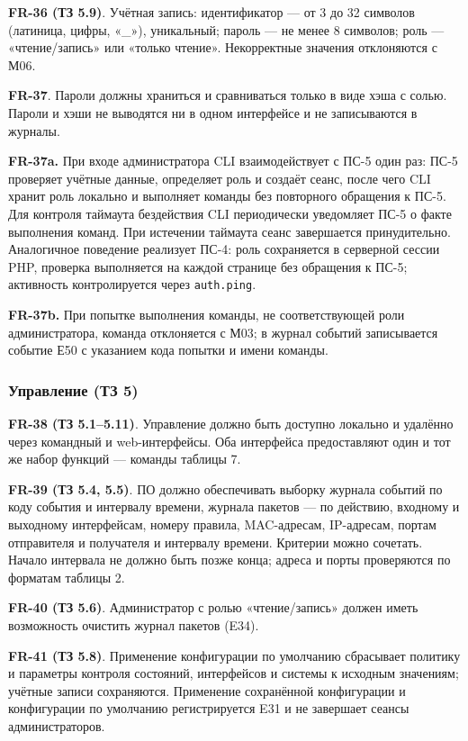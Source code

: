 \documentclass[13pt,a4paper,final]{article}
\begin{document}
	\textbf{FR-36 (ТЗ 5.9)}. Учётная запись: идентификатор — от 3 до 32 символов (латиница, цифры, «\_»), уникальный; пароль — не менее 8 символов; роль — «чтение/запись» или «только чтение». Некорректные значения отклоняются с М06.
	
	\textbf{FR-37}. Пароли должны храниться и сравниваться только в виде хэша с солью. Пароли и хэши не выводятся ни в одном интерфейсе и не записываются в журналы.
	
	\textbf{FR-37a.} При входе администратора CLI взаимодействует с ПС-5 один раз: ПС-5 проверяет учётные данные, определяет роль и создаёт сеанс, после чего CLI хранит роль локально и выполняет команды без повторного обращения к ПС-5. Для контроля таймаута бездействия CLI периодически уведомляет ПС-5 о факте выполнения команд. При истечении таймаута сеанс завершается принудительно. {Аналогичное поведение реализует ПС-4: роль сохраняется в серверной сессии PHP, проверка выполняется на каждой странице без обращения к ПС-5; активность контролируется через \texttt{auth.ping}.}
	
	\textbf{FR-37b.} При попытке выполнения команды, не соответствующей роли администратора, команда отклоняется с М03; в журнал событий записывается событие Е50 с указанием кода попытки и имени команды.
	
	\subsubsection{Управление (ТЗ 5)}
	
	\textbf{FR-38 (ТЗ 5.1–5.11)}. Управление должно быть доступно локально и удалённо через командный и web-интерфейсы. Оба интерфейса предоставляют один и тот же набор функций — команды таблицы 7.
	
	\textbf{FR-39 (ТЗ 5.4, 5.5)}. ПО должно обеспечивать выборку журнала событий по коду события и интервалу времени, журнала пакетов — по действию, входному и выходному интерфейсам, номеру правила, MAC-адресам, IP-адресам, портам отправителя и получателя и интервалу времени. Критерии можно сочетать. Начало интервала не должно быть позже конца; адреса и порты проверяются по форматам таблицы 2.
	
	\textbf{FR-40 (ТЗ 5.6)}. Администратор с ролью «чтение/запись» должен иметь возможность очистить журнал пакетов (E34).
	
	\textbf{FR-41 (ТЗ 5.8)}. Применение конфигурации по умолчанию сбрасывает политику и параметры контроля состояний, интерфейсов и системы к исходным значениям; учётные записи сохраняются. Применение сохранённой конфигурации и конфигурации по умолчанию регистрируется E31 и не завершает сеансы администраторов.
	
\end{document}
